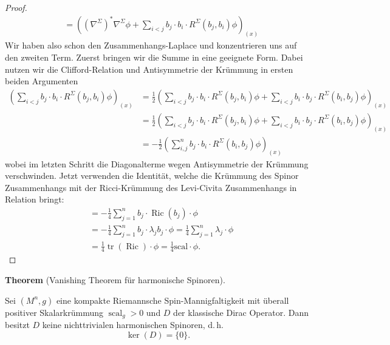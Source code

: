 \documentclass[10pt, letterpaper]{article}
\newcommand{\CustomHeading}[3]{%
  \par\medskip\noindent%
  \textbf{#1 #2} \textnormal{(#3)}.\enskip%
}
\newenvironment{THEO}[2]{\CustomHeading{Theorem}{#1}{#2}}{}
\begin{document}
\begin{proof}
$$\begin{aligned}
    & =\left(\left(\nabla^{\Sigma}\right)^* \nabla^{\Sigma} \phi+\sum_{i<j} b_j \cdot b_i \cdot R^{\Sigma}\left(b_j, b_i\right) \phi\right)_{(x)}
  \end{aligned}$$
  Wir haben also schon den Zusammenhangs-Laplace und konzentrieren uns auf den zweiten Term. Zuerst bringen wir die Summe in eine geeignete Form. Dabei nutzen wir die Clifford-Relation und Antisymmetrie der Krümmung in ersten beiden Argumenten
  $$\begin{aligned}
    \left(\sum_{i<j} b_j \cdot b_i \cdot R^{\Sigma}\left(b_j, b_i\right) \phi\right)_{(x)} 
    & = \frac{1}{2}\left(\sum_{i<j} b_j \cdot b_i \cdot R^{\Sigma}\left(b_j, b_i\right) \phi + \sum_{i<j} b_i \cdot b_j \cdot R^{\Sigma}\left(b_i, b_j\right) \phi\right)_{(x)} \\
    & = \frac{1}{2}\left(\sum_{i<j} b_j \cdot b_i \cdot R^{\Sigma}\left(b_j, b_i\right) \phi + \sum_{i<j} b_i \cdot b_j \cdot R^{\Sigma}\left(b_i, b_j\right) \phi\right)_{(x)} \\
    & =- \frac{1}{2}\left(\sum_{i,j}^n b_j \cdot b_i \cdot R^{\Sigma}\left(b_i, b_j\right) \phi \right)_{(x)} 
  \end{aligned}$$
  wobei im letzten Schritt die Diagonalterme wegen Antisymmetrie der Krümmung verschwinden. Jetzt verwenden die Identität, welche die Krümmung des Spinor Zusammenhangs mit der Ricci-Krümmung des Levi-Civita Zusammenhangs in Relation bringt:
  $$\begin{aligned} 
    &=-\frac{1}{4} \sum_{j=1}^n b_j \cdot \operatorname{Ric}\left(b_j\right) \cdot \phi \\ 
    & =-\frac{1}{4} \sum_{j=1}^n b_j \cdot \lambda_j b_j \cdot \phi=\frac{1}{4} \sum_{j=1}^n \lambda_j \cdot \phi \\ 
    & =\frac{1}{4} \operatorname{tr}(\operatorname{Ric}) \cdot \phi=\frac{1}{4} \mathrm{scal} \cdot \phi.
  \end{aligned}$$

\end{proof}


\begin{THEO}{}{Vanishing Theorem für harmonische Spinoren}
Sei $(M^n,g)$ eine kompakte Riemannsche Spin-Mannigfaltigkeit mit überall
positiver Skalarkrümmung $\operatorname{scal}_g>0$ und $D$ der
klassische Dirac Operator. Dann besitzt $D$ keine nichttrivialen
harmonischen Spinoren, d.\,h.
\[
\ker(D)=\{0\}.
\]
\end{THEO}
\end{document}
